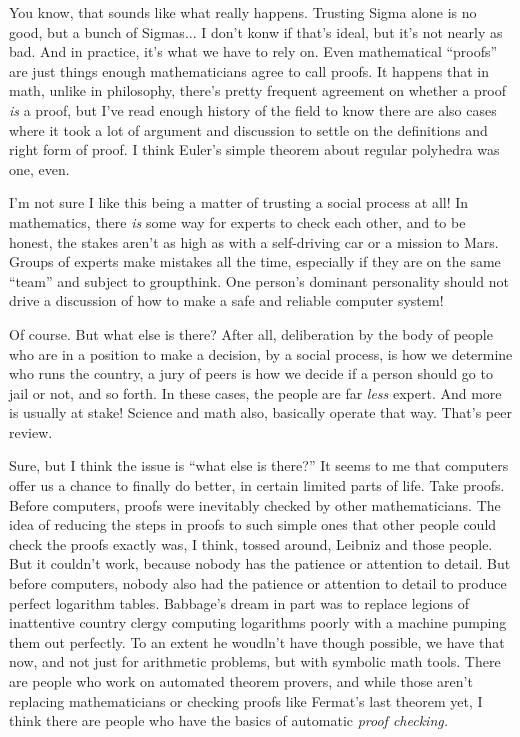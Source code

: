 \documentclass[sigplan]{acmart}
\begin{document}
 You know, that sounds like what really
happens.  Trusting Sigma alone is no good, but a bunch of Sigmas...  I
don't konw if that's ideal, but it's not nearly as bad.  And in
practice, it's what we have to rely on.  Even mathematical ``proofs''
are just things enough mathematicians agree to call proofs.  It
happens that in math, unlike in philosophy, there's pretty frequent
agreement on whether a proof \emph{is} a proof, but I've read enough
history of the field to know there are also cases where it took a lot
of argument and discussion to settle on the definitions and right form
of proof.  I think Euler's simple theorem about regular polyhedra was
one, even.

  I'm not sure I like this being a matter
of trusting a social process at all!  In mathematics, there \emph{is}
some way for experts to check each other, and to be honest, the stakes
aren't as high as with a self-driving car or a mission to Mars.
Groups of experts make mistakes all the time, especially if they are
on the same ``team'' and subject to groupthink.  One person's dominant
personality should not drive a discussion of how to make a safe and
reliable computer system!

 Of course.  But what else is there?  After
all, deliberation by the body of people who are in a position to make
a decision, by a social process, is how we determine who runs the country, a jury
of peers is how we decide if a person should go to jail or not, and so
forth.  In these cases, the people are far \emph{less} expert.  And
more is usually at stake!  Science and math also, basically operate
that way.  That's peer review.

  Sure, but I think the issue is ``what
else is there?''  It seems to me that computers offer us a chance to
finally do better, in certain limited parts of life.  Take proofs.
Before computers, proofs were inevitably checked by other
mathematicians.  The idea of reducing the steps in proofs to such
simple ones that other people could check the proofs exactly was, I
think, tossed around, Leibniz and those people.  But it couldn't work,
because nobody has the patience or attention to detail.  But before
computers, nobody also had the patience or attention to detail to
produce perfect logarithm tables.  Babbage's dream in part was to
replace legions of inattentive country clergy computing logarithms
poorly with a machine pumping them out perfectly.  To an extent he
woudln't have though possible, we have that now, and not just for
arithmetic problems, but with symbolic math tools.  There are people
who work on automated theorem provers, and while those aren't
replacing mathematicians or checking proofs like Fermat's last theorem
yet, I think there are people who have the basics of automatic
\emph{proof checking.}
\end{document}
